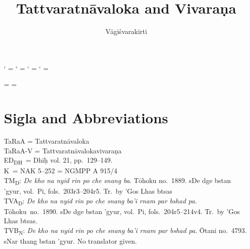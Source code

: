 \documentclass[12pt]{article}
\title{Tattvaratnāvaloka and Vivaraṇa}
\author{Vāgīśvarakīrti}
\begin{document}
\maketitle

\makeatletter
\newXeTeXintercharclass\noextraclass
\XeTeXcharclass `\? = \noextraclass
\XeTeXcharclass `\! = \noextraclass
\XeTeXcharclass `\; = \noextraclass
\XeTeXcharclass `\: = \noextraclass

 \noextraclass = {\nobreak}
\XeTeXinterchartoks {} = {\nobreak}
\makeatother

\newcommand{\PCreading}{$^{pc}$}
\newcommand{\ACreading}{$^{ac}$}
\newcommand{\MS}{K}
\newcommand{\EDD}{ED\textsubscript{DH}}
\newcommand{\TM}{TM\textsubscript{D}}
\newcommand{\TVA}{TVA\textsubscript{D}}
\newcommand{\TVB}{TVB\textsubscript{N}}
\newcommand{\sigmareading}[1]{$\Sigma$\textsubscript{#1}}

\newcommand{\emd} {\emph{em.}}
\newcommand{\conj} {\emph{conj.}}
\newcommand{\corr} {\emph{corr.}}
\newcommand{\diag} {\emph{diag.\ conj.}}
\newcommand{\possibleemd} {\emph{possible em.}}
\newcommand{\possibleconj} {\emph{possible conj.}}

\section{Sigla and Abbreviations}
\noindent TaRaA = Tattvaratnāvaloka\\

\noindent TaRaA-V = Tattvaratnāvalokavivaraṇa\\

\noindent \EDD\ = Dhīḥ vol. 21, pp.\ 129–149.\\

\noindent \MS\ = NAK 5–252 = NGMPP A 915/4\\

\noindent \TM : \emph{De kho na nyid rin po che snang ba}. Tōhoku no.\ 1889. sDe dge bstan 'gyur, vol.\ Pi, fols.\ 203r3–204r5. Tr.\ by 'Gos Lhas btsas\\

\noindent \TVA : \emph{De kho na nyid rin po che snang ba'i rnam par bshad pa}.  Tōhoku\ no.\ 1890.  sDe dge bstan 'gyur, vol.\ Pi, fols.\ 204r5–214v4. Tr.\ by 'Gos Lhas btsas.\\

\noindent \TVB : \emph{De kho na nyid rin po che snang ba'i rnam par bshad pa}. Ōtani no.\ 4793. sNar thang bstan 'gyur. No translator given.
\end{document}
